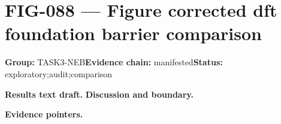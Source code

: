 \clearpage
\section{FIG-088 --- Figure corrected dft foundation barrier comparison}
\label{figpage:fig-088}
\textbf{Group:} TASK3-NEB\quad \textbf{Evidence chain:} manifested\quad \textbf{Status:} exploratory;audit;comparison

\textbf{Results text draft.} 
\textbf{Discussion and boundary.} 


\textbf{Evidence pointers.}



\vfill
